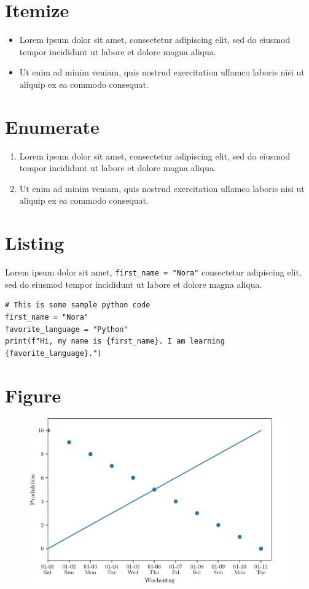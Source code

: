 \section*{Itemize}
\begin{itemize}
    \item Lorem ipsum dolor sit amet, consectetur adipiscing elit, sed do eiusmod tempor incididunt ut labore et dolore magna aliqua.
    \item Ut enim ad minim veniam, quis nostrud exercitation ullamco laboris nisi ut aliquip ex ea commodo consequat.
\end{itemize}

\section*{Enumerate}
\begin{enumerate}
    \item Lorem ipsum dolor sit amet, consectetur adipiscing elit, sed do eiusmod tempor incididunt ut labore et dolore magna aliqua.
    \item Ut enim ad minim veniam, quis nostrud exercitation ullamco laboris nisi ut aliquip ex ea commodo consequat.
\end{enumerate}

\section*{Listing}
Lorem ipsum dolor sit amet, \lstinline[style=python]{first_name = "Nora"} consectetur adipiscing elit, sed do eiusmod tempor incididunt ut labore et dolore magna aliqua.

\begin{lstlisting}[style=python]
# This is some sample python code
first_name = "Nora"
favorite_language = "Python"
print(f"Hi, my name is {first_name}. I am learning {favorite_language}.")
\end{lstlisting}

\section*{Figure}
\begin{figure}[H]
    {\includegraphics[width=\hsize]{Resources/figure.pdf}
    }
\end{figure}

